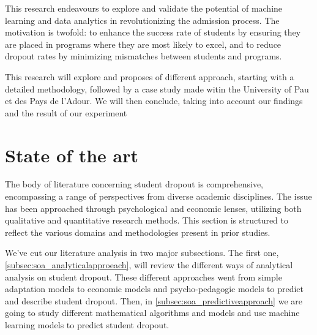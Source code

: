 \documentclass[conference]{IEEEtran}
\begin{document}
This research endeavours to explore and validate the potential of machine learning and data analytics in revolutionizing the admission process. The motivation is twofold: to enhance the success rate of students by ensuring they are placed in programs where they are most likely to excel, and to reduce dropout rates by minimizing mismatches between students and programs.

This research will explore and proposes of different approach, starting with a detailed methodology, followed by a case study made witin the University of Pau et des Pays de l'Adour. 
We will then conclude, taking into account our findings and the result of our experiment 

\section{State of the art}
\label{sec:soa}
The body of literature concerning student dropout is comprehensive, encompassing a range of perspectives from diverse academic disciplines. The issue has been approached through psychological and economic lenses, utilizing both qualitative and quantitative research methods. This section is structured to reflect the various domains and methodologies present in prior studies. 

We've cut our literature analysis in two major subsections. The first one, \ref{subsec:soa_analyticalapproeach}, will review the different ways of analytical analysis on student dropout. These different approaches went from simple adaptation models to economic models and psycho-pedagogic models to predict and describe student dropout. Then, in \ref{subsec:soa_predictiveapproach} we are going to study different mathematical algorithms and models and use machine learning models to predict student dropout.
\end{document}
